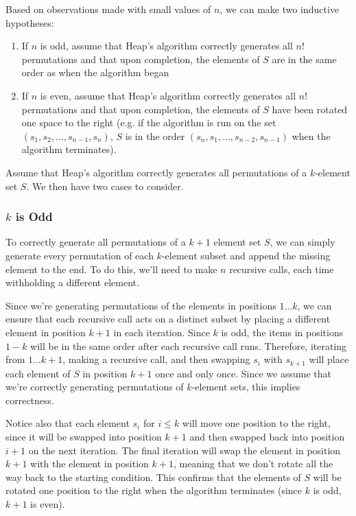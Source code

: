 \documentclass[10pt, oneside]{article}   	%
\begin{document}
Based on observations made with small values of $n$, we can make two inductive hypotheses:
\begin{enumerate}
	\item If $n$ is odd, assume that Heap's algorithm correctly generates all $n!$ permutations and that upon completion, the elements of $S$ are in the same order as when the algorithm began
	\item If $n$ is even, assume that Heap's algorithm correctly generates all $n!$ permutations and that upon completion, the elements of $S$ have been rotated one space to the right (e.g. if the algorithm is run on the set $(s_{1}, s_{2}, \dots, s_{n - 1}, s_{n})$, $S$ is in the order $(s_{n}, s_{1}, \dots, s_{n - 2}, s_{n - 1})$ when the algorithm terminates).
\end{enumerate}

Assume that Heap's algorithm correctly generates all permutations of a $k$-element set $S$. We then have two cases to consider.

\subsubsection{$k$ is Odd}

To correctly generate all permutations of a $k + 1$ element set $S$, we can simply generate every permutation of each $k$-element subset and append the missing element to the end. To do this, we'll need to make $n$ recursive calls, each time withholding a different element.

Since we're generating permutations of the elements in positions $1 \dots k$, we can ensure that each recursive call acts on a distinct subset by placing a different element in position $k + 1$ in each iteration. Since $k$ is odd, the items in positions $1 - k$ will be in the same order after each recursive call runs. Therefore, iterating from $1 \dots k + 1$, making a recursive call, and then swapping $s_{i}$ with $s_{k + 1}$ will place each element of $S$ in position $k + 1$ once and only once. Since we assume that we're correctly generating permutations of $k$-element sets, this implies correctness.

Notice also that each element $s_{i}$ for $i \leq k$ will move one position to the right, since it will be swapped into position $k + 1$ and then swapped back into position $i + 1$ on the next iteration. The final iteration will swap the element in position $k + 1$ with the element in position $k + 1$, meaning that we don't rotate all the way back to the starting condition. This confirms that the elements of $S$ will be rotated one position to the right when the algorithm terminates (since $k$ is odd, $k + 1$ is even).
\end{document}
